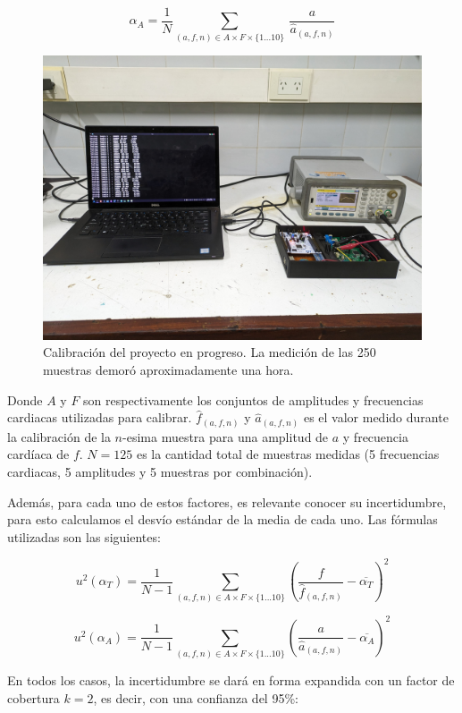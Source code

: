 \documentclass[conference]{IEEEtran}
\begin{document}
$$\alpha_{A} = \dfrac{1}{N} \sum_{(a,f,n) \in A \times F \times \{1...10 \}}\nolimits
~ \frac{a}{\hat{a}_{(a,f,n)}} $$ 
\begin{figure}[b]
    \centering
    \includegraphics[width=\linewidth]{figs/foto_calibracion.jpeg}
    \caption{Calibración del proyecto en progreso. La medición de las 250 muestras
    demoró aproximadamente una hora.}
    \label{fig:calibracion}

\end{figure}
Donde $A$ y $F$ son respectivamente los conjuntos de amplitudes y frecuencias
cardiacas utilizadas para calibrar. $\hat{f}_{(a,f,n)}$ y $\hat{a}_{(a,f,n)}$ es el valor medido durante
la calibración de la $n$-esima muestra para una amplitud de $a$ y
frecuencia cardíaca de $f$. $N=125$ es la cantidad total de
muestras medidas (5 frecuencias cardiacas, 5 amplitudes y 5 muestras por combinación).

Además, para cada uno de estos factores, es relevante conocer su incertidumbre,
para esto calculamos el desvío estándar de la media de cada uno. Las fórmulas
utilizadas son las siguientes:

$$ u^2 \left( \alpha_{T} \right) = \dfrac{1}{N - 1} \sum_{(a,f,n) \in A \times F
\times \{1...10 \}}\nolimits \left( \frac{f}{\hat{f}_{(a,f,n)}} - \overline{\alpha_{T}}
\right)^2 $$ 

$$ u^2 \left( \alpha_{A} \right) = \dfrac{1}{N - 1} \sum_{(a,f,n) \in A \times F
\times \{1...10 \}}\nolimits \left( \frac{a}{\hat{a}_{(a,f,n)}} - \overline{\alpha_{A}}
\right)^2 $$ 

En todos los casos, la incertidumbre se dará en forma expandida con un factor de
cobertura $k = 2$, es decir, con una confianza del 95\%:
\end{document}
